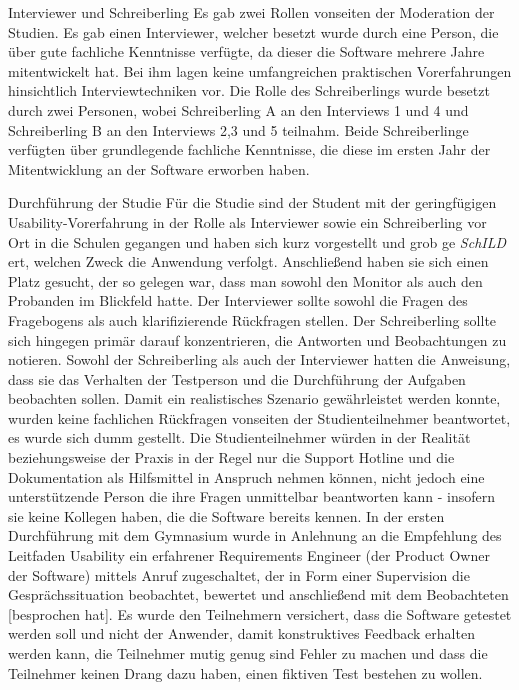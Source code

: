 Interviewer und Schreiberling
Es gab zwei Rollen vonseiten der Moderation der Studien. Es gab einen Interviewer, welcher besetzt wurde durch eine Person, die über gute fachliche Kenntnisse verfügte, da dieser die Software mehrere Jahre mitentwickelt hat. Bei ihm lagen keine umfangreichen praktischen Vorerfahrungen hinsichtlich Interviewtechniken vor. Die Rolle des Schreiberlings wurde besetzt durch zwei Personen, wobei Schreiberling A an den Interviews 1 und 4 und Schreiberling B an den Interviews 2,3 und 5 teilnahm. Beide Schreiberlinge verfügten über grundlegende fachliche Kenntnisse, die diese im ersten Jahr der Mitentwicklung an der Software erworben haben.

Durchführung der Studie
Für die Studie sind der Student mit der geringfügigen Usability-Vorerfahrung in der Rolle als Interviewer sowie ein Schreiberling vor Ort in die Schulen gegangen und haben sich kurz vorgestellt und grob ge \textit{SchILD} ert, welchen Zweck die Anwendung verfolgt. Anschließend haben sie sich einen Platz gesucht, der so gelegen war, dass man sowohl den Monitor als auch den Probanden im Blickfeld hatte. Der Interviewer sollte sowohl die Fragen des Fragebogens als auch klarifizierende Rückfragen stellen. Der Schreiberling sollte sich hingegen primär darauf konzentrieren, die Antworten und Beobachtungen zu notieren.
Sowohl der Schreiberling als auch der Interviewer hatten die Anweisung, dass sie das Verhalten der Testperson und die Durchführung der Aufgaben beobachten sollen. 
Damit ein realistisches Szenario gewährleistet werden konnte, wurden keine fachlichen Rückfragen vonseiten der Studienteilnehmer beantwortet, es wurde sich dumm gestellt. Die Studienteilnehmer würden in der Realität beziehungsweise der Praxis in der Regel nur die Support Hotline und die Dokumentation als Hilfsmittel in Anspruch nehmen können, nicht jedoch eine unterstützende Person die ihre Fragen unmittelbar beantworten kann - insofern sie keine Kollegen haben, die die Software bereits kennen. 
In der ersten Durchführung mit dem Gymnasium wurde in Anlehnung an die Empfehlung des Leitfaden Usability ein erfahrener Requirements Engineer (der Product Owner der Software) mittels Anruf zugeschaltet, der \glqq in Form einer Supervision die Gesprächssituation beobachtet, bewertet und anschließend mit dem Beobachteten [besprochen hat]\glqq  \cite[p.~133]{dakks}.
Es wurde den Teilnehmern versichert, dass die Software getestet werden soll und nicht der Anwender, damit konstruktives Feedback erhalten werden kann, die Teilnehmer mutig genug sind Fehler zu machen und dass die Teilnehmer keinen Drang dazu haben, einen fiktiven Test bestehen zu wollen.

